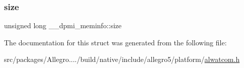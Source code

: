 \mbox{\label{struct____dpmi__meminfo_a9f335d9001c365d1dee9511477543106}} 
\subsubsection{\texorpdfstring{size}{size}}
{\footnotesize\ttfamily unsigned long \+\_\+\+\_\+dpmi\+\_\+meminfo\+::size}



The documentation for this struct was generated from the following file\+:\begin{DoxyCompactItemize}
\item 
src/packages/\+Allegro..../build/native/include/allegro5/platform/\hyperlink{alwatcom_8h}{alwatcom.\+h}\end{DoxyCompactItemize}
